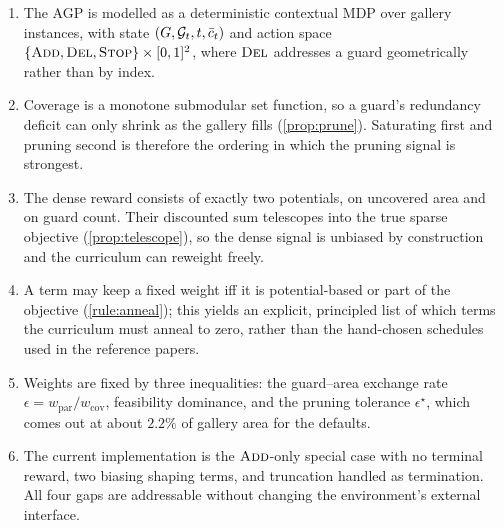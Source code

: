 \documentclass[11pt,a4paper]{article}
\begin{document}
\begin{enumerate}[label=\textbf{\arabic*.}]
  \item The AGP is modelled as a deterministic contextual MDP over gallery instances, with
        state $(G, \mathcal{G}_t, t, \bar c_t)$ and action space
        $\{\textsc{Add},\textsc{Del},\textsc{Stop}\}\times[0,1]^2$, where $\textsc{Del}$ addresses a guard geometrically
        rather than by index.
  \item Coverage is a monotone submodular set function, so a guard's redundancy deficit can
        only shrink as the gallery fills (\cref{prop:prune}). Saturating first and pruning
        second is therefore the ordering in which the pruning signal is strongest.
  \item The dense reward consists of exactly two potentials, on uncovered area and on guard
        count. Their discounted sum telescopes into the true sparse objective
        (\cref{prop:telescope}), so the dense signal is unbiased by construction and the
        curriculum can reweight freely.
  \item A term may keep a fixed weight iff it is potential-based or part of the objective
        (\cref{rule:anneal}); this yields an explicit, principled list of which terms the
        curriculum must anneal to zero, rather than the hand-chosen schedules used in the
        reference papers.
  \item Weights are fixed by three inequalities: the guard--area exchange rate
        $\epsilon = w_{\mathrm{par}}/w_{\mathrm{cov}}$, feasibility dominance, and the pruning
        tolerance $\epsilon^{\star}$, which comes out at about $2.2\%$ of gallery area for
        the defaults.
  \item The current implementation is the $\textsc{Add}$-only special case with no terminal reward,
        two biasing shaping terms, and truncation handled as termination. All four gaps are
        addressable without changing the environment's external interface.
\end{enumerate}


\renewcommand{\refname}{References}

\end{document}
